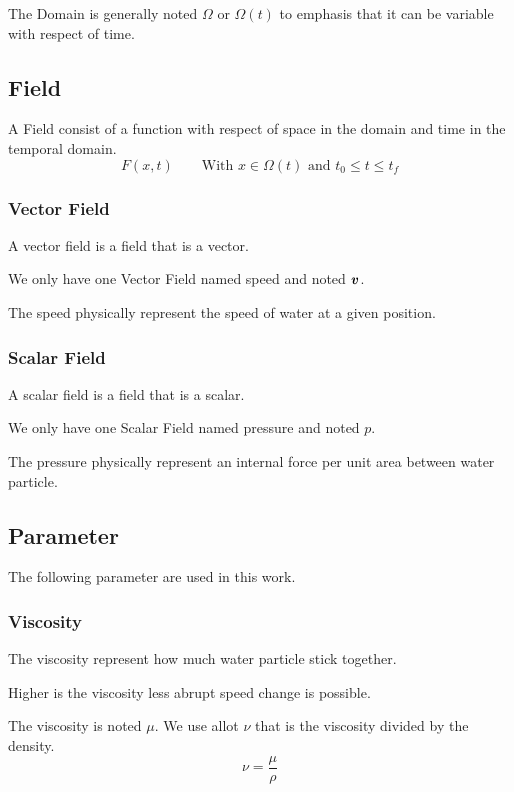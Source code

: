The Domain is generally noted $\Omega$ or $\Omega(t)$ to emphasis that it can be variable with respect of time.

\subsection{Field}

A Field consist of a function with respect of space in the domain and time in the temporal domain.
\begin{equation}
 F(x,t)\qquad \text{With $x\in\Omega(t)$ and $t_0\leq t \leq t_f$}
\end{equation}

\subsubsection{Vector Field}
A vector field is a field that is a vector.

We only have one Vector Field named speed and noted ${\boldsymbol {v}}$.

The speed physically represent the speed of water at a given position.
\subsubsection{Scalar Field}
A scalar field is a field that is a scalar.

We only have one Scalar Field named pressure and noted $p$.

The pressure physically represent an internal force per unit area between water particle.

\subsection{Parameter}

The following parameter are used in this work.

\subsubsection{Viscosity}
The viscosity represent how much water particle stick together.

Higher is the viscosity less abrupt speed change is possible.

The viscosity is noted $\mu$. We use allot $\nu$ that is the viscosity divided by the density.
\begin{equation}
 \nu=\frac{\mu}{\rho}
\end{equation}

